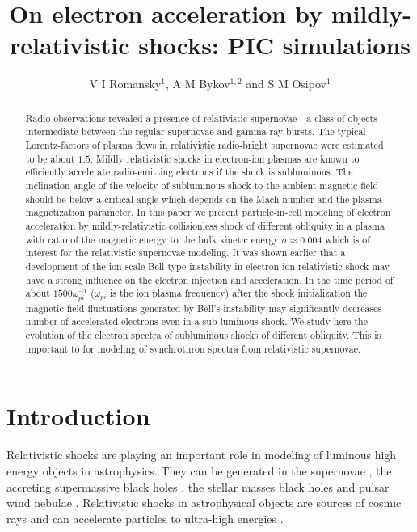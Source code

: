 \documentclass[a4paper]{jpconf}
\begin{document}
	\title{On electron acceleration  by mildly-relativistic shocks: PIC simulations}
	
	\author{V I Romansky$^{1}$, A M Bykov$^{1,2}$ and S M Osipov$^{1}$}
	
	\address{$^1$ Ioffe Institute, 26 Politekhnicheskaya st., St. Petersburg 194021, Russia}
	\address{$^2$ Peter the Great St. Petersburg Polytechnic University, 29 Politekhnicheskaya st., St. Petersburg 195251, Russia}
	
	
	\begin{abstract}
                 Radio observations revealed a presence of relativistic supernovae - a class of objects intermediate between the regular supernovae and gamma-ray bursts. The typical Lorentz-factors of plasma flows in relativistic radio-bright supernovae were estimated to be about $1.5$. Mildly relativistic shocks in electron-ion plasmas are known to efficiently accelerate radio-emitting electrons if the shock is subluminous. The inclination angle of the velocity of subluminous shock to the ambient magnetic field should be below a critical angle which depends on the Mach number and the plasma magnetization parameter.  In this paper we present particle-in-cell modeling of electron acceleration by mildly-relativistic collisionless shock of different obliquity in a plasma with ratio of the magnetic energy to the bulk kinetic energy $\sigma \approx 0.004$ which is of interest for the relativistic supernovae modeling. It was shown earlier that  a development of the ion scale Bell-type instability in electron-ion relativistic shock may have a strong influence on the electron injection and acceleration. In the time period of about $1500 \omega_{pi}^{-1}$  ($\omega_{pi}$ is the ion plasma frequency) after the shock initialization the  magnetic field fluctuations  generated by Bell's instability may significantly decreases number of accelerated electrons even in a sub-luminous shock. We study here the evolution of the electron spectra of subluminous shocks of different obliquity. This is important to for modeling of synchrothron spectra from relativistic supernovae.
	\end{abstract}
	
	\section{Introduction}
	Relativistic shocks are playing an important role  in modeling of luminous high energy objects in  astrophysics. They can be generated in the supernovae \cite{2010Natur.463..513S,2007ApJ...667..351W}, the accreting supermassive black holes \cite{1984RvMP...56..255B}, the stellar masses black holes \cite{2019MmSAI..90...57M,1999PhR...314..575P,2014LNP...876.....R} and pulsar wind nebulae \cite{Amato2006,2017SSRv..207..235B,2017JPlPh..83e6301K,2019ApJ...876L...8B}. Relativistic shocks in astrophysical objects are sources of cosmic rays \cite{2012SSRv..173..309B,2015SSRv..191..519S,Pelletier2017} and can accelerate particles to ultra-high energies \cite{Wang2007,2009JCAP...11..009L,BEMO18}. 
	
\end{document}
